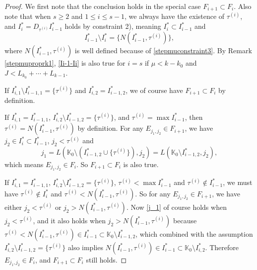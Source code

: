 \documentclass[11pt,reqno]{amsart}
\numberwithin{equation}{section}
\theoremstyle{definition}
\begin{document}
\begin{proof}
	We first note that the conclusion holds in the special case $F_{i+1}\subset F_i$. Also note that when $s\geq2$ and $1\leq i\leq s-1$, we always have the existence of $\tau^{(i)}$, and $I_i^*=D_{\tau^{(i)}}I_{i-1}^*$ holds by constraint 2), meaning $I_i^*\subset I_{i-1}^*$ and
	\begin{equation}\label{Ii-1-Ii}
		I_{i-1}^*\setminus I_i^*=\{N(I_{i-1}^*,\tau^{(i)})\},
	\end{equation}
	where $N(I_{i-1}^*,\tau^{(i)})$ is well defined because of \eqref{stepmuconstraint3}. By Remark \ref{stepmuproprk1}, \eqref{Ii-1-Ii} is also true for $i=s$ if $\mu<k-k_0$ and $J<L_{k_0}+\cdots+L_{k-1}$.
	
	If $I_{i,1}^*\setminus I_{i-1,1}^*=\{\tau^{(i)}\}$ and $I_{i,2}^*=I_{i-1,2}^*$, we of course have $F_{i+1}\subset F_i$ by definition.
	
	If $I_{i,1}^*=I_{i-1,1}^*$, $I_{i,2}^*\setminus I_{i-1,2}^*=\{\tau^{(i)}\}$, and $\tau^{(i)}=\max I_{i-1}^*$, then $\tau^{(i)}=N(I_{i-1}^*,\tau^{(i)})$ by definition. For any $E_{j_1,j_2}\in F_{i+1}$, we have $j_2\in I_i^*\subset I_{i-1}^*$, $j_2<\tau^{(i)}$ and
	\begin{equation}\label{j_1}
		j_1=L(\mathbb{K}_0\setminus(I_{i-1,2}^*\cup\{\tau^{(i)}\}),j_2)=L(\mathbb{K}_0\setminus I_{i-1,2}^*,j_2),
	\end{equation}
	which means $E_{j_1,j_2}\in F_i$. So $F_{i+1}\subset F_i$ is also true.
	
	If $I_{i,1}^*=I_{i-1,1}^*$, $I_{i,2}^*\setminus I_{i-1,2}^*=\{\tau^{(i)}\}$, $\tau^{(i)}<\max I_{i-1}^*$ and $\tau^{(i)}\notin I_{i-1}^*$, we must have $\tau^{(i)}\notin I_i^*$ and $\tau^{(i)}<N(I_{i-1}^*,\tau^{(i)})$. So for any $E_{j_1,j_2}\in F_{i+1}$, we have either $j_2<\tau^{(i)}$ or $j_2>N(I_{i-1}^*,\tau^{(i)})$. Now \eqref{j_1} of course holds when $j_2<\tau^{(i)}$, and it also holds when $j_2>N(I_{i-1}^*,\tau^{(i)})$ because $\tau^{(i)}<N(I_{i-1}^*,\tau^{(i)})\in I_{i-1}^*\subset\mathbb{K}_0\setminus I_{i-1,2}^*$, which combined with the assumption $I_{i,2}^*\setminus I_{i-1,2}^*=\{\tau^{(i)}\}$ also implies $N(I_{i-1}^*,\tau^{(i)})\in I_{i-1}^*\subset\mathbb{K}_0\setminus I_{i,2}^*$. Therefore $E_{j_1,j_2}\in F_i$, and $F_{i+1}\subset F_i$ still holds.
	

\end{proof}
\end{document}
